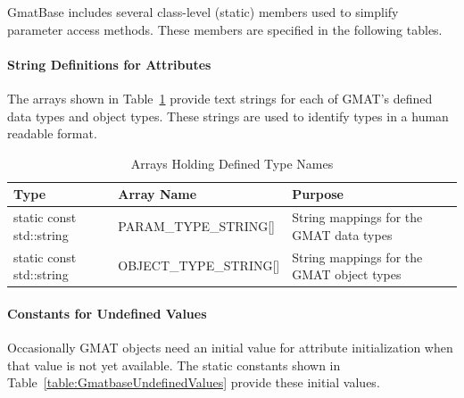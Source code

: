 GmatBase includes several class-level (static) members used to simplify parameter access methods.
These members are specified in the following tables.

\paragraph{String Definitions for Attributes}

The arrays shown in Table~\ref{table:PropertyTypesAndLabels} provide text strings for each of
GMAT's defined data types and object types.  These strings are used to identify types in a human
readable format.

\begin{table}[H]
\begin{center}
\caption{\label{table:PropertyTypesAndLabels}Arrays Holding Defined Type Names}
\setlength\extrarowheight{2pt}
\begin{tabular}{|p{1.35in}|p{1.75in}|p{2.7in}|}
\hline
Type & Array Name & Purpose \\
\hline
\hline
static const std::string & PARAM\_TYPE\_STRING[] & String mappings for the GMAT data types\\
static const std::string & OBJECT\_TYPE\_STRING[] & String mappings for the GMAT object types\\
\hline
\end{tabular}
\end{center}
\end{table}

\paragraph{Constants for Undefined Values}

Occasionally GMAT objects need an initial value for attribute initialization when that value is not
yet available.  The static constants shown in Table~\ref{table:GmatbaseUndefinedValues} provide
these initial values.

